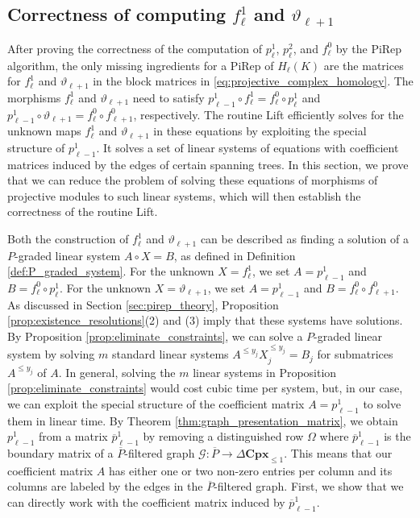 \documentclass[english,a4paper,nolineno,cleveref]{socg-lipics-v2021}
\begin{document}
\subsection{Correctness of computing $f_\ell^1$ and $\vartheta_{\ell+1}$} \label{subsec:graph_equations}

After proving the correctness of the computation of $p_\ell^1$, $p_\ell^2$, and $f^0_\ell$ by the {\sc PiRep} algorithm, the only missing ingredients for a PiRep of $H_\ell(K)$ are the matrices for $f^1_{\ell}$ and $\vartheta_{\ell+1}$ in the block matrices in \eqref{eq:projective_complex_homology}. The morphisms $f^1_{\ell}$ and $\vartheta_{\ell+1}$ need to satisfy $p_{\ell\minus 1}^1\circ f^1_{\ell}=f^0_\ell\circ p_\ell^1$ and $p_{\ell\minus 1}^1\circ \vartheta_{\ell+1}=f^0_\ell\circ f^0_{\ell+1}$, respectively. The routine {\sc Lift} efficiently solves for the unknown maps $f_\ell^1$ and $\vartheta_{\ell+1}$ in these equations by exploiting the special structure of $p_{\ell\minus 1}^1$. It solves a set of linear systems of equations with coefficient matrices induced by the edges of certain spanning trees. In this section, we prove that we can reduce the problem of solving these equations of morphisms of projective modules to such linear systems, which will then establish the correctness of the routine {\sc Lift}.  

Both the construction of $f^1_{\ell}$ and $\vartheta_{\ell+1}$ can be described as finding a solution of a $P$-graded linear system $A\circ X=B$, as defined in Definition \ref{def:P_graded_system}. For the unknown $X=f^1_{\ell}$, we set $A=p_{\ell\minus 1}^1$ and $B=f^0_\ell\circ p_\ell^1$. For the unknown $X=\vartheta_{\ell+1}$, we set $A=p_{\ell\minus 1}^1$ and $B=f^0_\ell\circ f^0_{\ell+1}$. As discussed in Section \ref{sec:pirep_theory}, Proposition \ref{prop:existence_resolutions}(2) and (3) imply that these systems have solutions. By Proposition \ref{prop:eliminate_constraints}, we can solve a $P$-graded linear system by solving $m$ standard linear systems $A^{\leq y_j}X^{\leq y_j}_j=B_j$ for submatrices $A^{\leq y_j}$ of $A$. In general, solving the $m$ linear systems in Proposition \ref{prop:eliminate_constraints} would cost cubic time per system, but, in our case, we can exploit the special structure of the coefficient matrix $A=p_{\ell\minus 1}^1$ to solve them in linear time. By Theorem \ref{thm:graph_presentation_matrix}, we obtain $p_{\ell\minus 1}^1$ from a matrix $\overline{p}_{\ell\minus 1}^1$ by removing a distinguished row $\Omega$ where $\overline{p}_{\ell\minus 1}^1$ is the boundary matrix of a $\overline{P}$-filtered graph $\mathcal{G}\colon \overline{P}\rightarrow \Delta\mathbf{Cpx}_{\leq 1}$. This means that our coefficient matrix $A$ has either one or two non-zero entries per column and its columns are labeled by the edges in the $\overline{P}$-filtered graph. First, we show that we can directly work with the coefficient matrix induced by $\overline{p}_{\ell\minus 1}^1$.  
\end{document}

